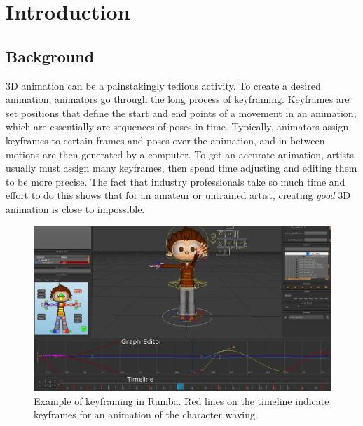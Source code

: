 \chapter{Introduction}\label{chap:intro}
\newcommand{\ignore}[1]{}
\ignore{Write this chapter LAST. Should be 5 to 10 pages. This chapter provides a quick summary of the
essential contents of the research project, principal results and contents of the report. The target
audience is members of the jury who do NOT have time to completely read all 21 reports, as well
academic members of other juries who wish to compare this work to other works.}

\section{Background}
\ignore{This is a generic title. Replace it with an actual title that describes the context of the work.
Short .5 page summary of the technological context of the work and why it is interesting or important}

3D animation can be a painstakingly tedious activity. To create a desired animation, animators go through the long process of keyframing. Keyframes are set positions that define the start and end points of a movement in an animation, which are essentially are sequences of poses in time. Typically, animators assign keyframes to certain frames and poses over the animation, and in-between motions are then generated by a computer. To get an accurate animation, artists usually must assign many keyframes, then spend time adjusting and editing them to be more precise. The fact that industry professionals take so much time and effort to do this shows that for an amateur or untrained artist, creating \textit{good} 3D animation is close to impossible.

\begin{figure}[h!]
\centering
\includegraphics[scale=0.28]{img/angelo2}
\caption{Example of keyframing in Rumba. Red lines on the timeline indicate keyframes for an animation of the character waving.}
\label{fig:keyframes}
\end{figure}

